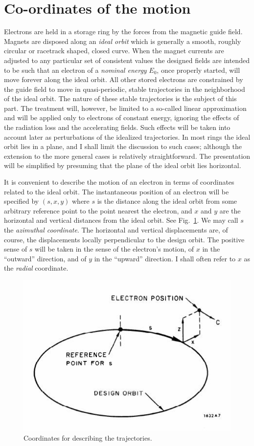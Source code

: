 \section{Co-ordinates of the motion} \label{sec:2.1}
Electrons are held in a storage ring by the forces from the magnetic guide field. Magnets are disposed along an \textit{ideal orbit} which is generally a smooth, roughly circular or racetrack shaped, closed curve. When the magnet currents are adjusted to any particular set of consistent values the designed fields are intended to be such that an electron of a \textit{nominal energy} $E_0$, once properly started, will move forever along the ideal orbit. All other stored electrons are constrained by the guide field to move in quasi-periodic, stable trajectories in the neighborhood of the ideal orbit. The nature of these stable trajectories is the subject of this part. The treatment will, however, be limited to a so-called linear approximation and will be applied only to electrons of constant energy, ignoring the effects of the radiation loss and the accelerating fields. Such effects will be taken into account later as perturbations of the idealized trajectories. In most rings the ideal orbit lies in a plane, and I shall limit the discussion to such cases; although the extension to the more general cases is relatively straightforward. The presentation will be simplified by presuming that the plane of the ideal orbit lies horizontal.

It is convenient to describe the motion of an electron in terms of coordinates related to the ideal orbit. The instantaneous position of an electron will be specified by $(s, x, y)$ where $s$ is the distance along the ideal orbit from some arbitrary reference point to the point nearest the electron, and $x$ and $y$ are the horizontal and vertical distances from the ideal orbit. See Fig.~\ref{fig:fig7}. We may call $s$ the \textit{azimuthal coordinate}. The horizontal and vertical displacements are, of course, the displacements locally perpendicular to the design orbit. The positive sense of $s$ will be taken in the sense of the electron’s motion, of $x$ in the “outward” direction, and of $y$ in the “upward” direction. I shall often refer to $x$ as the \textit{radial} coordinate.

\begin{figure}[!htb]
	\centering
	\includegraphics[width=0.6\linewidth]{./Figuras/fig07.jpeg}
	\caption{Coordinates for describing the trajectories.}
	\label{fig:fig7}
\end{figure}

